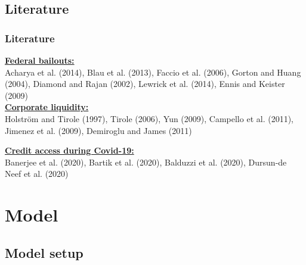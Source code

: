 \documentclass[13.8pt]{beamer}
\begin{document}
\subsection{Literature}

\begin{frame}
\frametitle{Literature}
\textbf{\large\underline{Federal bailouts:}}\\ 
Acharya et al. (2014), Blau et al. (2013), Faccio et al. (2006), Gorton and Huang (2004), Diamond and Rajan (2002), Lewrick et al. (2014), Ennis and Keister (2009) \\
\vspace{0.5cm}
\textbf{\large\underline{Corporate liquidity:}}\\
Holström and Tirole (1997), Tirole (2006), Yun (2009), Campello et al. (2011), Jimenez et al. (2009), Demiroglu and James (2011)


\vspace{1cm}
\textbf{\large\underline{Credit access during Covid-19:}}\\
Banerjee et al. (2020), Bartik et al. (2020), Balduzzi et al. (2020), Dursun-de Neef et al. (2020)


\end{frame}




\section{Model}
\subsection{Model setup}
\end{document}

